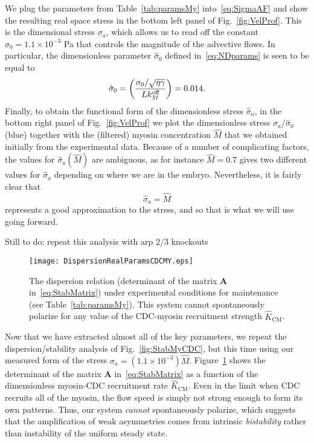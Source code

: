 \documentclass[11pt]{article}
\newcommand{\red}[1]{\color{red}#1\normalcolor}
\newcommand{\M}[1]{\boldsymbol{#1}}
\newcommand{\6}[1]{#1_{\text{6}}}
\newcommand{\3}[1]{#1_{\text{3}}}
\newcommand{\My}[1]{#1_M}
\begin{document}
We plug the parameters from Table\ \ref{tab:paramsMy} into\ \eqref{eq:SigmaAF} and show the resulting real space stress in the bottom left panel of Fig.\ \ref{fig:VelProf}. This is the dimensional stress $\sigma_a$, which allows us to read off the constant $\sigma_0=1.1 \times 10^{-3}$ Pa that controls the magnitude of the advective flows. In particular, the dimensionless parameter $\hat{\sigma}_0$ defined in\ \eqref{eq:NDparams} is seen to be equal to
\begin{equation}
\hat{\sigma}_0 = \left(\frac{\sigma_0/ \sqrt{\eta \gamma} }{L \My{\koff}}\right)  = 0.014.
\end{equation}
Finally, to obtain the functional form of the dimensionless stress $\hat \sigma_a$, in the bottom right panel of Fig.\ \ref{fig:VelProf} we plot the dimensionless stress $\sigma_a/\hat \sigma_0$ (blue) together with the (filtered) myosin concentration $\hat M$ that we obtained initially from the experimental data. Because of a number of complicating factors, the values for $\hat \sigma_a( \hat M)$ are ambiguous, as for instance $\hat M=0.7$ gives two different values for $\hat \sigma_a$ depending on where we are in the embryo. Nevertheless, it is fairly clear that 
\begin{equation}
\hat \sigma_a=\hat M
\end{equation}
represents a good approximation to the stress, and so that is what we will use going forward.

\red{Still to do: repeat this analysis with arp 2/3 knockouts}


\begin{figure}
\centering
\texttt{[image: DispersionRealParamsCDCMY.eps]}
\caption{\label{fig:DispReal} The dispersion relation (determinant of the matrix $\M{A}$ in\ \eqref{eq:StabMatrix}) under experimental conditions for maintenance (see Table\ \ref{tab:paramsMy}). This system cannot spontaneously polarize for any value of the CDC-myosin recruitment strength $\hat K_\text{CM}$.}
\end{figure}

Now that we have extracted almost all of the key parameters, we repeat the dispersion/stability analysis of Fig.\ \ref{fig:StabMyCDC}, but this time using our measured form of the stress $\sigma_a = \left(1.1 \times 10^{-3}\right) \hat M$. Figure\ \ref{fig:DispReal} shows the determinant of the matrix $\M A$ in\ \eqref{eq:StabMatrix} as a function of the dimensionless myosin-CDC recruitment rate $\hat K_\text{CM}$. Even in the limit when CDC recruits all of the myosin, the flow speed is simply not strong enough to form its own patterns. Thus, our system \emph{cannot} spontaneously polarize, which suggests that the amplification of weak asymmetries comes from intrinsic \emph{bistability} rather than instability of the uniform steady state. 
\end{document}
